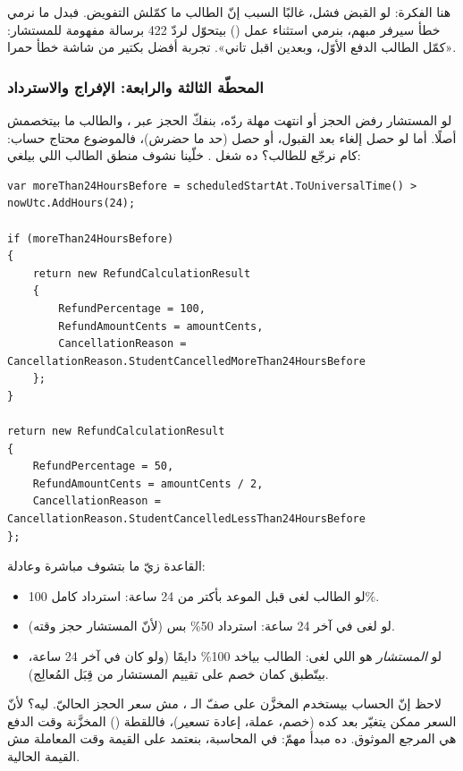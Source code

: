 هنا الفكرة: لو القبض فشل، غالبًا السبب إنّ الطالب ما كمّلش التفويض. فبدل ما
نرمي خطأ سيرفر مبهم، بنرمي استثناء عمل () بيتحوّل لردّ 422
برسالة مفهومة للمستشار: «كمّل الطالب الدفع الأوّل، وبعدين اقبل تاني». تجربة أفضل
بكتير من شاشة خطأ حمرا.

\subsubsection{المحطّة الثالثة والرابعة: الإفراج والاسترداد}

لو المستشار رفض الحجز أو انتهت مهلة ردّه، بنفكّ الحجز عبر
، والطالب ما بيتخصمش أصلًا. أما لو حصل إلغاء بعد
القبول، أو حصل  (حد ما حضرش)، فالموضوع محتاج حساب: كام نرجّع للطالب؟
ده شغل . خلّينا نشوف منطق الطالب اللي بيلغي:

\begin{english}
\begin{lstlisting}[language={[Sharp]C}]
var moreThan24HoursBefore = scheduledStartAt.ToUniversalTime() > nowUtc.AddHours(24);

if (moreThan24HoursBefore)
{
    return new RefundCalculationResult
    {
        RefundPercentage = 100,
        RefundAmountCents = amountCents,
        CancellationReason = CancellationReason.StudentCancelledMoreThan24HoursBefore
    };
}

return new RefundCalculationResult
{
    RefundPercentage = 50,
    RefundAmountCents = amountCents / 2,
    CancellationReason = CancellationReason.StudentCancelledLessThan24HoursBefore
};
\end{lstlisting}
\end{english}

القاعدة زيّ ما بتشوف مباشرة وعادلة:
\begin{itemize}
\item لو الطالب لغى قبل الموعد بأكتر من 24 ساعة: استرداد كامل 100\%.
\item لو لغى في آخر 24 ساعة: استرداد 50\% بس (لأنّ المستشار حجز وقته).
\item لو \emph{المستشار} هو اللي لغى: الطالب بياخد 100\% دايمًا (ولو كان في آخر
  24 ساعة، بيتّطبق كمان خصم على تقييم المستشار من قِبَل المُعالِج).
\end{itemize}

\begin{keyp}
لاحظ إنّ الحساب بيستخدم  المخزَّن على صفّ الـ ،
مش سعر الحجز الحاليّ. ليه؟ لأنّ السعر ممكن يتغيّر بعد كده (خصم، عملة، إعادة
تسعير)، فاللقطة () المخزَّنة وقت الدفع هي المرجع الموثوق. ده مبدأ
مهمّ: في المحاسبة، بنعتمد على القيمة وقت المعاملة مش القيمة الحالية.
\end{keyp}


